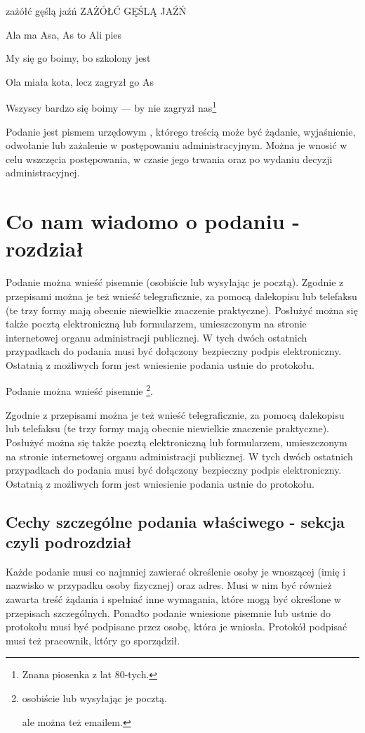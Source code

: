 zażółć gęślą jaźń ZAŻÓŁĆ GĘŚLĄ JAŹŃ

Ala ma Asa, As to Ali pies

My się go boimy, bo szkolony jest

Ola miała kota, lecz zagryzł go As

Wszyscy bardzo się boimy --- by nie zagryzł nas\footnote{Znana piosenka
  z lat 80-tych.}

Podanie jest pismem urzędowym , którego treścią może być żądanie,
wyjaśnienie, odwołanie lub zażalenie w postępowaniu administracyjnym.
Można je wnosić w celu wszczęcia postępowania, w czasie jego trwania
oraz po wydaniu decyzji administracyjnej.

\section{Co nam wiadomo o podaniu - rozdział}

Podanie można wnieść pisemnie (osobiście lub wysyłając je pocztą).
Zgodnie z przepisami można je też wnieść telegraficznie, za pomocą
dalekopisu lub telefaksu (te trzy formy mają obecnie niewielkie
znaczenie praktyczne). Posłużyć można się także pocztą elektroniczną lub
formularzem, umieszczonym na stronie internetowej organu administracji
publicznej. W tych dwóch ostatnich przypadkach do podania musi być
dołączony bezpieczny podpis elektroniczny. Ostatnią z możliwych form
jest wniesienie podania ustnie do protokołu.

Podanie można wnieść pisemnie \footnote{osobiście lub wysyłając je
  pocztą.

  ale można też emailem.}.

Zgodnie z przepisami można je też wnieść telegraficznie, za pomocą
dalekopisu lub telefaksu (te trzy formy mają obecnie niewielkie
znaczenie praktyczne). Posłużyć można się także pocztą elektroniczną lub
formularzem, umieszczonym na stronie internetowej organu administracji
publicznej. W tych dwóch ostatnich przypadkach do podania musi być
dołączony bezpieczny podpis elektroniczny. Ostatnią z możliwych form
jest wniesienie podania ustnie do protokołu.

\subsection{Cechy szczególne podania właściwego - sekcja czyli
podrozdział}

Każde podanie musi co najmniej zawierać określenie osoby je wnoszącej
(imię i nazwisko w przypadku osoby fizycznej) oraz adres. Musi w nim być
również zawarta treść żądania i spełniać inne wymagania, które mogą być
określone w przepisach szczególnych. Ponadto podanie wniesione pisemnie
lub ustnie do protokołu musi być podpisane przez osobę, która je
wniosła. Protokół podpisać musi też pracownik, który go sporządził.

